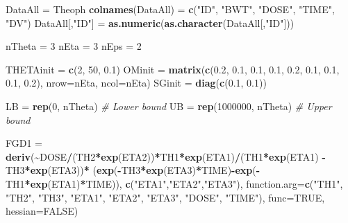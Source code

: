 \documentclass[
  10pt,
  krantz2,
  a4paper]{krantz}
\newenvironment{Shaded}{\begin{snugshade}}{\end{snugshade}}
\newcommand{\CommentTok}[1]{\textcolor[rgb]{0.56,0.35,0.01}{\textit{#1}}}
\newcommand{\DataTypeTok}[1]{\textcolor[rgb]{0.13,0.29,0.53}{#1}}
\newcommand{\DecValTok}[1]{\textcolor[rgb]{0.00,0.00,0.81}{#1}}
\newcommand{\FloatTok}[1]{\textcolor[rgb]{0.00,0.00,0.81}{#1}}
\newcommand{\KeywordTok}[1]{\textcolor[rgb]{0.13,0.29,0.53}{\textbf{#1}}}
\newcommand{\NormalTok}[1]{#1}
\newcommand{\OperatorTok}[1]{\textcolor[rgb]{0.81,0.36,0.00}{\textbf{#1}}}
\newcommand{\OtherTok}[1]{\textcolor[rgb]{0.56,0.35,0.01}{#1}}
\newcommand{\StringTok}[1]{\textcolor[rgb]{0.31,0.60,0.02}{#1}}
\newenvironment{Shaded}{\begin{snugshade}}{\end{snugshade}}
\theoremstyle{definition}
\theoremstyle{definition}
\theoremstyle{definition}
\theoremstyle{remark}
\begin{document}
\begin{Shaded}
\begin{Highlighting}[]
\NormalTok{DataAll =}\StringTok{ }\NormalTok{Theoph}
\KeywordTok{colnames}\NormalTok{(DataAll) =}\StringTok{ }\KeywordTok{c}\NormalTok{(}\StringTok{"ID"}\NormalTok{, }\StringTok{"BWT"}\NormalTok{, }\StringTok{"DOSE"}\NormalTok{, }\StringTok{"TIME"}\NormalTok{, }\StringTok{"DV"}\NormalTok{)}
\NormalTok{DataAll[,}\StringTok{"ID"}\NormalTok{] =}\StringTok{ }\KeywordTok{as.numeric}\NormalTok{(}\KeywordTok{as.character}\NormalTok{(DataAll[,}\StringTok{"ID"}\NormalTok{]))}

\NormalTok{nTheta =}\StringTok{ }\DecValTok{3}
\NormalTok{nEta =}\StringTok{ }\DecValTok{3}
\NormalTok{nEps =}\StringTok{ }\DecValTok{2}

\NormalTok{THETAinit =}\StringTok{ }\KeywordTok{c}\NormalTok{(}\DecValTok{2}\NormalTok{, }\DecValTok{50}\NormalTok{, }\FloatTok{0.1}\NormalTok{)}
\NormalTok{OMinit =}\StringTok{ }\KeywordTok{matrix}\NormalTok{(}\KeywordTok{c}\NormalTok{(}\FloatTok{0.2}\NormalTok{, }\FloatTok{0.1}\NormalTok{, }\FloatTok{0.1}\NormalTok{, }\FloatTok{0.1}\NormalTok{, }\FloatTok{0.2}\NormalTok{, }\FloatTok{0.1}\NormalTok{, }\FloatTok{0.1}\NormalTok{, }\FloatTok{0.1}\NormalTok{, }\FloatTok{0.2}\NormalTok{), }
                \DataTypeTok{nrow=}\NormalTok{nEta, }\DataTypeTok{ncol=}\NormalTok{nEta)}
\NormalTok{SGinit =}\StringTok{ }\KeywordTok{diag}\NormalTok{(}\KeywordTok{c}\NormalTok{(}\FloatTok{0.1}\NormalTok{, }\FloatTok{0.1}\NormalTok{))}

\NormalTok{LB =}\StringTok{ }\KeywordTok{rep}\NormalTok{(}\DecValTok{0}\NormalTok{, nTheta) }\CommentTok{\# Lower bound}
\NormalTok{UB =}\StringTok{ }\KeywordTok{rep}\NormalTok{(}\DecValTok{1000000}\NormalTok{, nTheta) }\CommentTok{\# Upper bound}

\NormalTok{FGD1 =}\StringTok{ }\KeywordTok{deriv}\NormalTok{(}\OperatorTok{\textasciitilde{}}\NormalTok{DOSE}\OperatorTok{/}\NormalTok{(TH2}\OperatorTok{*}\KeywordTok{exp}\NormalTok{(ETA2))}\OperatorTok{*}\NormalTok{TH1}\OperatorTok{*}\KeywordTok{exp}\NormalTok{(ETA1)}\OperatorTok{/}\NormalTok{(TH1}\OperatorTok{*}\KeywordTok{exp}\NormalTok{(ETA1) }\OperatorTok{{-}}\StringTok{ }\NormalTok{TH3}\OperatorTok{*}\KeywordTok{exp}\NormalTok{(ETA3))}\OperatorTok{*}
\StringTok{             }\NormalTok{(}\KeywordTok{exp}\NormalTok{(}\OperatorTok{{-}}\NormalTok{TH3}\OperatorTok{*}\KeywordTok{exp}\NormalTok{(ETA3)}\OperatorTok{*}\NormalTok{TIME)}\OperatorTok{{-}}\KeywordTok{exp}\NormalTok{(}\OperatorTok{{-}}\NormalTok{TH1}\OperatorTok{*}\KeywordTok{exp}\NormalTok{(ETA1)}\OperatorTok{*}\NormalTok{TIME)),}
             \KeywordTok{c}\NormalTok{(}\StringTok{"ETA1"}\NormalTok{,}\StringTok{"ETA2"}\NormalTok{,}\StringTok{"ETA3"}\NormalTok{),}
             \DataTypeTok{function.arg=}\KeywordTok{c}\NormalTok{(}\StringTok{"TH1"}\NormalTok{, }\StringTok{"TH2"}\NormalTok{, }\StringTok{"TH3"}\NormalTok{, }\StringTok{"ETA1"}\NormalTok{, }\StringTok{"ETA2"}\NormalTok{, }\StringTok{"ETA3"}\NormalTok{, }\StringTok{"DOSE"}\NormalTok{,}
                           \StringTok{"TIME"}\NormalTok{),}
             \DataTypeTok{func=}\OtherTok{TRUE}\NormalTok{, }\DataTypeTok{hessian=}\OtherTok{FALSE}\NormalTok{)}


\end{Highlighting}
\end{Shaded}
\end{document}
